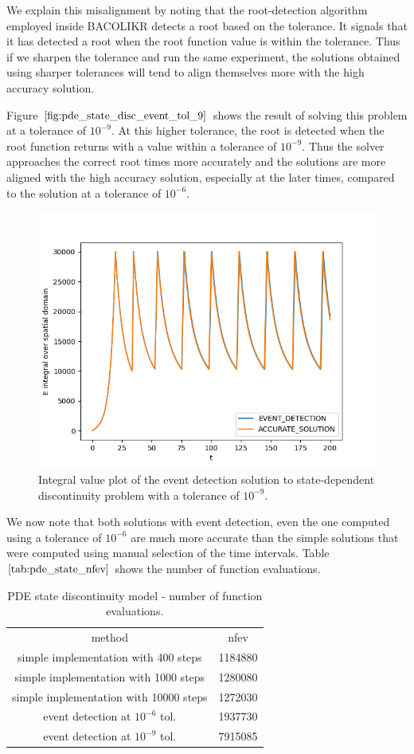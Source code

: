 We explain this misalignment by noting that the root-detection algorithm employed inside BACOLIKR detects a root based on the tolerance. It signals that it has detected a root when the root function value is within the tolerance. Thus if we sharpen the tolerance and run the same experiment, the solutions obtained using sharper tolerances will tend to align themselves more with the high accuracy solution.

Figure $\ref{fig:pde_state_disc_event_tol_9}$ shows the result of solving this problem at a tolerance of $10^{-9}$. At this higher tolerance, the root is detected when the root function returns with a value within a tolerance of $10^{-9}$. Thus the solver approaches the correct root times more accurately and the solutions are more aligned with the high accuracy solution, especially at the later times, compared to the solution at a tolerance of $10^{-6}$.


\begin{figure}[H]
\centering
\includegraphics[width=0.7\linewidth]{./figures/pde_state_disc_event_tol_9}
\caption{Integral value plot of the event detection solution to state-dependent discontinuity problem with a tolerance of $10^{-9}$.}
\label{fig:pde_state_disc_event_tol_9}
\end{figure}

We now note that both solutions with event detection, even the one computed using a tolerance of $10^{-6}$ are much more accurate than the simple solutions that were computed using manual selection of the time intervals. Table $\ref{tab:pde_state_nfev}$ shows the number of function evaluations. 

\begin{table}[h]
\caption {PDE state discontinuity model - number of function evaluations.} 
\label{tab:pde_state_nfev}
\begin{center}
\begin{tabular}{ c c } 
method & nfev \\ 
simple implementation with 400 steps   & 1184880 \\
simple implementation with 1000 steps  & 1280080 \\
simple implementation with 10000 steps & 1272030 \\
event detection at $10^{-6}$ tol.     & 1937730 \\
event detection at $10^{-9}$ tol.     & 7915085 \\
\end{tabular}
\end{center}
\end{table}

